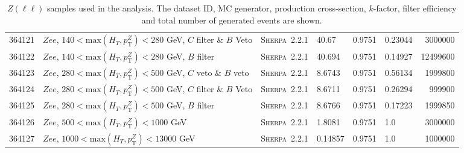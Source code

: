 \begin{table}[!htb]
{\begin{tabular}{llllllr}
      364121 & $Z ee $, $140<\text{max}(H_T,p_{\text{T}}^Z)<280$ GeV, $C$ filter \& $B$ Veto & \textsc{Sherpa}~2.2.1 &   40.67             & 0.9751& 0.23044 &    3000000\\
      364122 & $Z ee $, $140<\text{max}(H_T,p_{\text{T}}^Z)<280$ GeV, $B$ filter & \textsc{Sherpa}~2.2.1 &               40.694            & 0.9751& 0.14927 &   12499600\\
      364123 & $Z ee $, $280<\text{max}(H_T,p_{\text{T}}^Z)<500$ GeV, $C$ veto \& $B$ veto & \textsc{Sherpa}~2.2.1 &     8.6743            & 0.9751& 0.56134 &    1999800\\
      364124 & $Z ee $, $280<\text{max}(H_T,p_{\text{T}}^Z)<500$ GeV, $C$ filter \& $B$ Veto & \textsc{Sherpa}~2.2.1 &   8.6711            & 0.9751& 0.26294 &    999900 \\
      364125 & $Z ee $, $280<\text{max}(H_T,p_{\text{T}}^Z)<500$ GeV, $B$ filter & \textsc{Sherpa}~2.2.1 &               8.6766            & 0.9751& 0.17223 &   1999850 \\
      364126 & $Z ee $, $500<\text{max}(H_T,p_{\text{T}}^Z)<1000$ GeV                      & \textsc{Sherpa}~2.2.1 &     1.8081            & 0.9751& 1.0 	&   3000000 \\
      364127 & $Z ee $, $1000<\text{max}(H_T,p_{\text{T}}^Z)<13000$ GeV                      & \textsc{Sherpa}~2.2.1 &   0.14857           & 0.9751& 1.0 	&   1000000 \\
      \bottomrule
    \end{tabular}
  }
  \caption{$Z(\ell\ell)$ samples used in the analysis. The dataset ID, MC
    generator, production cross-section, $k$-factor, filter efficiency and total
    number of generated events are shown.}
  \label{tabular:mc_samples_Zlljets}
\end{table}